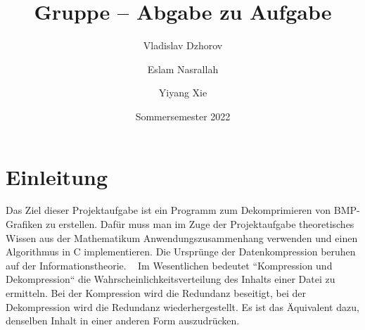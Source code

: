 \documentclass[course=erap]{aspdoc}
\author{Vladislav Dzhorov \and Eslam Nasrallah \and Yiyang Xie}
\date{Sommersemester 2022} %
\title{Gruppe \theGroup{} -- Abgabe zu Aufgabe \theNumber}
\begin{document}
    \maketitle


    \section{Einleitung}\label{sec:einleitung}
    Das Ziel dieser Projektaufgabe ist ein Programm zum Dekomprimieren
    von BMP-Grafiken zu erstellen.
    Dafür muss man im Zuge der Projektaufgabe theoretisches Wissen aus der Mathematikum
    Anwendungszusammenhang verwenden und einen Algorithmus in C implementieren.
    \newline
    \newline
    Die Ursprünge der Datenkompression beruhen auf der Informationstheorie. \ \cite{shannon}
    \newline
    Im Wesentlichen bedeutet ``Kompression und Dekompression`` die Wahrscheinlichkeitsverteilung des Inhalts einer
    Datei zu ermitteln.
    Bei der Kompression wird die Redundanz beseitigt, bei der Dekompression wird die Redundanz wiederhergestellt.
    Es ist das Äquivalent dazu, denselben Inhalt in einer anderen Form auszudrücken.

%
\end{document}
